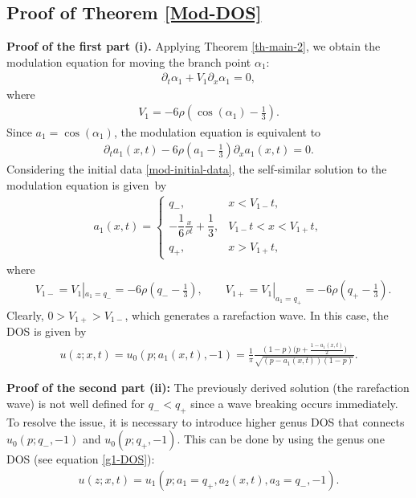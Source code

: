 \documentclass[pdftex]{sigma}
\numberwithin{equation}{section}
\begin{document}
\subsection{Proof of Theorem \ref{Mod-DOS}}

\textbf{Proof of the first part (i).} Applying Theorem \ref{th-main-2}, we obtain the modulation equation for moving the branch point $\alpha_1$:
\begin{align*}
\partial_t\alpha_1+V_1\partial_x\alpha_1=0,
\end{align*}
where
\begin{align*}
V_1 =-6\rho\left(\cos(\alpha_1)-\frac{1}{3}\right).%
\end{align*}
Since $a_1=\cos(\alpha_1)$, the modulation equation is equivalent to
\begin{align*}
\partial_t a_1(x,t)-6\rho\left(a_1-\frac{1}{3}\right)\partial_x a_1(x,t)=0.
\end{align*}
Considering the initial data \eqref{mod-initial-data}, the self-similar solution to the modulation equation is given~by
\begin{align*}
a_1(x,t)=\begin{cases}
q_-,& x<V_{1-}t,\\
-\dfrac{1}{6}\frac{x}{\rho t}+\dfrac{1}{3},& V_{1-}t<x<V_{1+}t,\\
q_+,& x>V_{1+}t,
\end{cases}
\end{align*}
where
\begin{align*}
&V_{1-}=V_1|_{a_1=q_-}=-6\rho\left(q_--\frac{1}{3}\right),\qquad V_{1+}=V_1|_{a_1=q_+}=-6\rho\left(q_+-\frac{1}{3}\right).
\end{align*}
Clearly, $0>V_{1+}>V_{1-}$, which generates a rarefaction wave. In this case, the DOS is given by
\begin{align*}
u(z;x,t)=u_0(p;a_1(x,t),-1)=\frac{1}{\pi}\frac{(1-p)\bigl(p+\frac{1-a_1(x,t)}{2}\bigr)}{\sqrt{(p-a_1(x,t))(1-p)}}.
\end{align*}



\textbf{Proof of the second part (ii):} The previously derived solution (the rarefaction wave) is not well defined for $q_-<q_+$ since a wave breaking occurs immediately. To resolve the issue, it is necessary to introduce higher genus DOS that connects $u_0(p;q_-,-1)$ and $u_0(p;q_+,-1)$. This can be done by using the genus one DOS (see equation \eqref{g1-DOS}):
\begin{align*}
u(z;x,t)=u_1(p;a_1=q_+,a_2(x,t),a_3=q_-,-1).
\end{align*}
\end{document}
